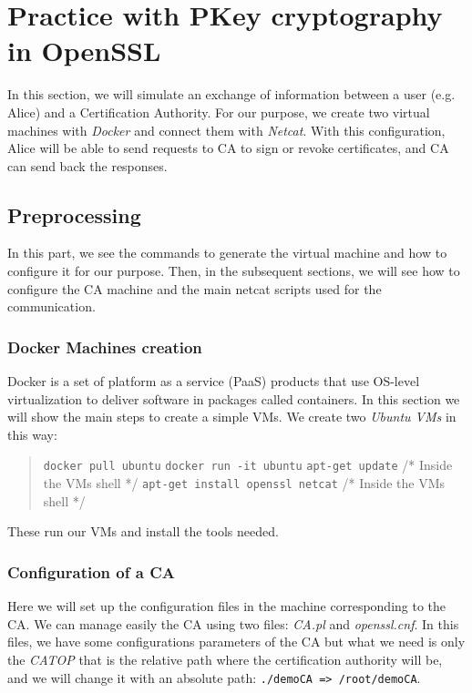 \documentclass[11pt]{article}
\begin{document}
\section{Practice with PKey cryptography in OpenSSL}
In this section, we will simulate an exchange of information between a user (e.g. Alice) and a Certification Authority. For our purpose, we create two virtual machines with {\em Docker} and connect them with {\em Netcat}. With this configuration, Alice will be able to send requests to CA to sign or revoke certificates, and CA can send back the responses.

\subsection{Preprocessing}
In this part, we see the commands to generate the virtual machine and how to configure it for our purpose. Then, in the subsequent sections, we will see how to configure the CA machine and the main netcat scripts used for the communication.

\subsubsection{Docker Machines creation}
Docker is a set of platform as a service (PaaS) products that use OS-level virtualization to deliver software in packages called containers. In this section we will show the main steps to create a simple VMs. We create two {\em Ubuntu VMs} in this way:

\begin{quote}
 \texttt{docker pull ubuntu}\newline
 \texttt{docker run -it ubuntu}\newline
 \texttt{apt-get update} \quad\quad\quad\quad\quad\quad /* Inside the VMs shell */ \newline
 \texttt{apt-get install openssl netcat} /* Inside the VMs shell */
\end{quote}

These run our VMs and install the tools needed.

\subsubsection{Configuration of a CA}
Here we will set up the configuration files in the machine corresponding to the CA. We can manage easily the CA using two files: {\em CA.pl} and {\em openssl.cnf}. In this files, we have some configurations parameters of the CA but what we need is only the {\em CATOP} that is the relative path where the certification authority will be, and we will change it with an absolute path: \texttt{./demoCA => /root/demoCA}.
\end{document}
